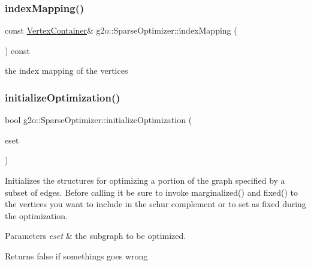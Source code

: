 \mbox{\label{classg2o_1_1_sparse_optimizer_a93e11150d513979a6367518ecaf26e02}} 
\subsubsection{\texorpdfstring{index\+Mapping()}{indexMapping()}}
{\footnotesize\ttfamily const \mbox{\hyperlink{structg2o_1_1_optimizable_graph_a54f01b9b6071e65e6abeebe4afb29dec}{Vertex\+Container}}\& g2o\+::\+Sparse\+Optimizer\+::index\+Mapping (\begin{DoxyParamCaption}{ }\end{DoxyParamCaption}) const\hspace{0.3cm}{\ttfamily [inline]}}



the index mapping of the vertices 

\mbox{\label{classg2o_1_1_sparse_optimizer_a56c0c13954ac7204cfb031c141ece9ae}} 
\subsubsection{\texorpdfstring{initialize\+Optimization()}{initializeOptimization()}\hspace{0.1cm}{\footnotesize\ttfamily [1/3]}}
{\footnotesize\ttfamily bool g2o\+::\+Sparse\+Optimizer\+::initialize\+Optimization (\begin{DoxyParamCaption}\item[{\mbox{\hyperlink{classg2o_1_1_hyper_graph_a5e2970e236c0dcb4eff7c205d7b6b4ae}{Hyper\+Graph\+::\+Edge\+Set}} \&}]{eset }\end{DoxyParamCaption})\hspace{0.3cm}{\ttfamily [virtual]}}

Initializes the structures for optimizing a portion of the graph specified by a subset of edges. Before calling it be sure to invoke marginalized() and fixed() to the vertices you want to include in the schur complement or to set as fixed during the optimization. 
\begin{DoxyParams}{Parameters}
{\em eset} & the subgraph to be optimized. \\
\hline
\end{DoxyParams}
\begin{DoxyReturn}{Returns}
false if somethings goes wrong 
\end{DoxyReturn}
\mbox{\label{classg2o_1_1_sparse_optimizer_ab16dd36e32577ba5856239ce721ec70b}} 

